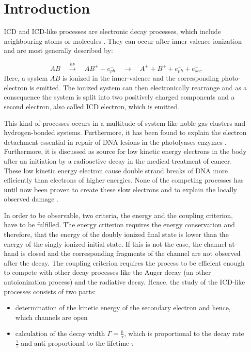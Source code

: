 \chapter{Introduction}
\ac{ICD} and \ac{ICD}-like processes are electronic decay processes,
which include neighbouring atoms or molecules \cite{Cederbaum97}.
They can occur after inner-valence ionization and
are most generally described by:

\begin{equation*}
 AB \quad \xrightarrow{h\nu}\quad AB^+ + e^-_{ph} \quad
    \rightarrow \quad A^+ + B^+ + e^-_{ph} + e^-_{sec}
\end{equation*}
Here, a system $AB$ is ionized in the inner-valence and the corresponding
photo-electron is emitted. The ionized system can then electronically
rearrange and as a consequence the system is split into two positively
charged components and a second electron, also called ICD electron, which is
emitted.

This kind of processes occurs in a multitude of system like noble gas clusters
and hydrogen-bonded systems. Furthermore, it has been found to explain
the electron detachment essential in repair of DNA lesions in the
photolyases enzymes \cite{Harbach13}. Furthermore, it is discussed as
source for low kinetic energy electrons in the body after an initiation
by a radioactive decay in the medical treatment of cancer. These low kinetic
energy electron cause
double strand breaks of DNA more efficiently than electrons of higher energies.
None of the competing processes has until now been proven to create these slow
electrons and to explain the locally observed damage \cite{Kim11, Hergenhahn12,
Boudaiffa00, Pan03, Martin04}.

In order to be observable, two criteria, the energy and the coupling criterion,
have to be fulfilled. The energy criterion requires the energy conservation
and therefore, that the energy of the doubly ionized final state is lower than
the energy of the singly ionized initial state. If this is not the case, the
channel at hand is closed and the corresponding fragments of the
channel are not observed after the decay.
The coupling criterion requires the process to be efficient enough to compete
with other decay processes like the Auger decay (an other autoionization
process) and the radiative decay.
Hence, the study of the \ac{ICD}-like processes consists of two parts:
\begin{itemize}
 \item determination of the kinetic energy of the secondary electron
       and hence, which channels are open
 \item calculation of the decay width $\Gamma=\frac{\hbar}{\tau}$, which
       is proportional to the decay rate $\frac{1}{\tau}$ and
       anti-proportional to the lifetime $\tau$
\end{itemize}

